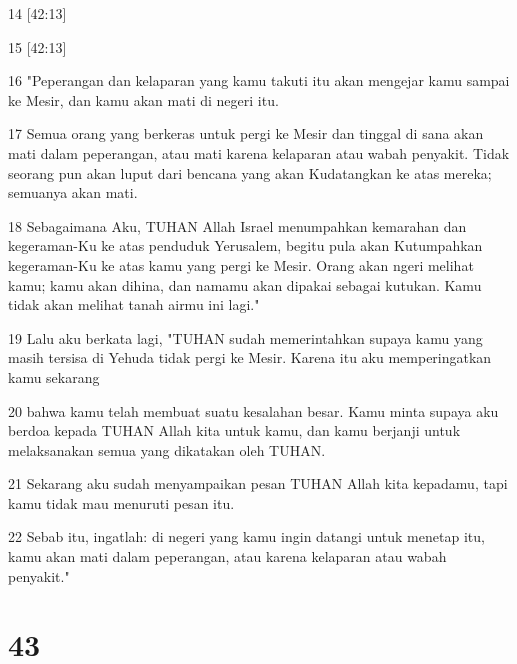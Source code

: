 \par 14 [42:13]
\par 15 [42:13]
\par 16 "Peperangan dan kelaparan yang kamu takuti itu akan mengejar kamu sampai ke Mesir, dan kamu akan mati di negeri itu.
\par 17 Semua orang yang berkeras untuk pergi ke Mesir dan tinggal di sana akan mati dalam peperangan, atau mati karena kelaparan atau wabah penyakit. Tidak seorang pun akan luput dari bencana yang akan Kudatangkan ke atas mereka; semuanya akan mati.
\par 18 Sebagaimana Aku, TUHAN Allah Israel menumpahkan kemarahan dan kegeraman-Ku ke atas penduduk Yerusalem, begitu pula akan Kutumpahkan kegeraman-Ku ke atas kamu yang pergi ke Mesir. Orang akan ngeri melihat kamu; kamu akan dihina, dan namamu akan dipakai sebagai kutukan. Kamu tidak akan melihat tanah airmu ini lagi."
\par 19 Lalu aku berkata lagi, "TUHAN sudah memerintahkan supaya kamu yang masih tersisa di Yehuda tidak pergi ke Mesir. Karena itu aku memperingatkan kamu sekarang
\par 20 bahwa kamu telah membuat suatu kesalahan besar. Kamu minta supaya aku berdoa kepada TUHAN Allah kita untuk kamu, dan kamu berjanji untuk melaksanakan semua yang dikatakan oleh TUHAN.
\par 21 Sekarang aku sudah menyampaikan pesan TUHAN Allah kita kepadamu, tapi kamu tidak mau menuruti pesan itu.
\par 22 Sebab itu, ingatlah: di negeri yang kamu ingin datangi untuk menetap itu, kamu akan mati dalam peperangan, atau karena kelaparan atau wabah penyakit."

\chapter{43}

